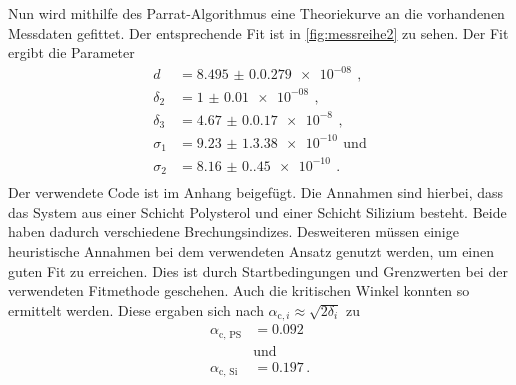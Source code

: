 Nun wird mithilfe des Parrat-Algorithmus eine Theoriekurve an die vorhandenen Messdaten gefittet.
Der entsprechende Fit ist in \autoref{fig:messreihe2} zu sehen.
Der Fit ergibt die Parameter
\begin{align*}
    d & = \qty{8.495(0.0279)e-08}{} \, , \\
    \delta_2 & = \qty{1(0.01)e-08}{} \, , \\
    \delta_3 & = \qty{4.67(0.017)e-8}{} \, , \\
    \sigma_1 & = \qty{9.23(1.338)e-10}{} \, \text{und} \\
    \sigma_2 & = \qty{8.16(0.45)e-10}{} \, . \\
\end{align*}
Der verwendete Code ist im Anhang beigefügt.
Die Annahmen sind hierbei, dass das System aus einer Schicht Polysterol und einer Schicht Silizium besteht.
Beide haben dadurch verschiedene Brechungsindizes.
Desweiteren müssen einige heuristische Annahmen bei dem verwendeten Ansatz genutzt werden, um einen guten Fit zu erreichen.
Dies ist durch Startbedingungen und Grenzwerten bei der verwendeten Fitmethode geschehen.
Auch die kritischen Winkel konnten so ermittelt werden.
Diese ergaben sich nach $\alpha_{\text{c}, i} \approx \sqrt{2 \delta_i}$ zu
\begin{align*}
    \alpha_{\text{c, PS}} &= 0.092 \\
    &\text{und} \\
    \alpha_{\text{c, Si}} &= 0.197 \, .
\end{align*}